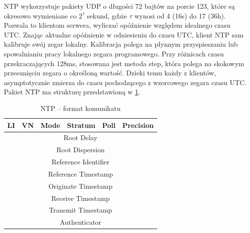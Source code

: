 \documentclass[../main.tex]{subfiles}
\begin{document}
NTP wykorzystuje pakiety UDP o długości 72 bajtów na porcie 123, które są okresowo wymieniane co ${2^\tau}$ sekund, gdzie ${\tau}$ wynosi od 4 (16s) do 17 (36h). 
Pozwala to klientom serwera, wyliczać opóźnienie względem idealnego czasu UTC.
Znając aktualne opóźnienie w odniesieniu do czasu UTC, klient NTP sam kalibruje swój zegar lokalny. Kalibracja polega na płynnym przyspieszaniu lub spowalnianiu pracy lokalnego zegara programowego.
Przy różnicach czasu przekraczających 128ms, stosowana jest metoda step, która polega na skokowym przesunięciu zegara o określoną wartość.
Dzieki temu każdy z klientów, asymptotycznie zmierza do czasu pochodzącego z wzorcowego zegara czasu UTC.
Pakiet NTP ma strukturę przedstawioną w \ref{tab:ntp}.

\begin{table}[H]
  \centering
  \begin{tabular}{|c|c|c|c|c|c|}
    \hline
    LI & VN & Mode & Stratum & Poll & Precision \\
    \hline
    \multicolumn{6}{|c|}{Root Delay} \\
    \hline
    \multicolumn{6}{|c|}{Root Dispersion} \\
    \hline
    \multicolumn{6}{|c|}{Reference Identifier} \\
    \hline
    \multicolumn{6}{|c|}{Reference Timestamp} \\
    \hline
    \multicolumn{6}{|c|}{Originate Timestamp} \\
    \hline
    \multicolumn{6}{|c|}{Receive Timestamp} \\
    \hline
    \multicolumn{6}{|c|}{Transmit Timestamp} \\
    \hline
    \multicolumn{6}{|c|}{Authenticator} \\
    \hline
  \end{tabular}
  \label{tab:ntp}
  \caption{NTP – format komunikatu \cite{st:serwerczasu-jpg}}

\end{table}
\end{document}
